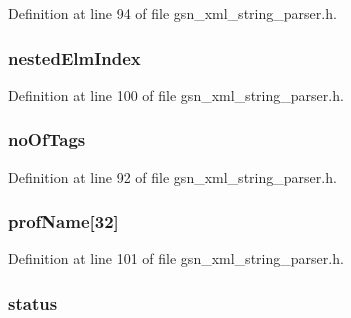 Definition at line 94 of file gsn\_\-xml\_\-string\_\-parser.h.

\hypertarget{a00444_a34df7c03795a09bbfd62858b0f9c0b8d}{
\subsubsection[{nestedElmIndex}]{ {\bf nestedElmIndex}}}
\label{a00444_a34df7c03795a09bbfd62858b0f9c0b8d}


Definition at line 100 of file gsn\_\-xml\_\-string\_\-parser.h.

\hypertarget{a00444_a1943ca791677dc1fd4be8e9d736df3ee}{
\subsubsection[{noOfTags}]{ {\bf noOfTags}}}
\label{a00444_a1943ca791677dc1fd4be8e9d736df3ee}


Definition at line 92 of file gsn\_\-xml\_\-string\_\-parser.h.

\hypertarget{a00444_a81eaaed6882a81ad762f0749cf27a0e8}{
\subsubsection[{profName}]{ {\bf profName}\mbox{[}32\mbox{]}}}
\label{a00444_a81eaaed6882a81ad762f0749cf27a0e8}


Definition at line 101 of file gsn\_\-xml\_\-string\_\-parser.h.

\hypertarget{a00444_ac6b7193d1fe7063cf448ef96398230d8}{
\subsubsection[{status}]{ {\bf status}}}
\label{a00444_ac6b7193d1fe7063cf448ef96398230d8}


